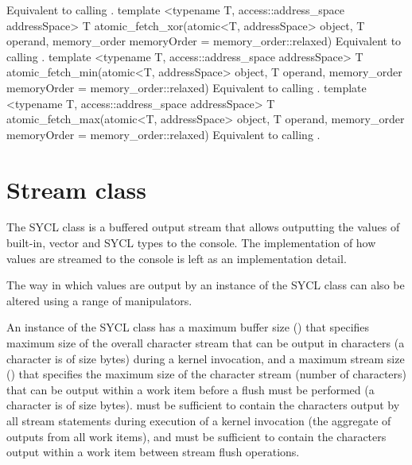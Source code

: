     {
      Equivalent to calling .
    }
  \addRowThreeSL
    { template <typename T, access::address_space addressSpace> }
    { T atomic_fetch_xor(atomic<T, addressSpace> object, T operand, }
    { memory_order memoryOrder = memory_order::relaxed) }
    {
      Equivalent to calling .
    }
  \addRowThreeSL
    { template <typename T, access::address_space addressSpace> }
    { T atomic_fetch_min(atomic<T, addressSpace> object, T operand, }
    { memory_order memoryOrder = memory_order::relaxed) }
    {
      Equivalent to calling .
    }
  \addRowThreeSL
    { template <typename T, access::address_space addressSpace> }
    { T atomic_fetch_max(atomic<T, addressSpace> object, T operand, }
    { memory_order memoryOrder = memory_order::relaxed) }
    {
      Equivalent to calling .
    }
\completeTable

\section{Stream class}
\label{subsection:stream}

The SYCL  class is a buffered output stream that allows outputting the values of built-in, vector and SYCL types to the console. The implementation of how values are streamed to the console is left as an implementation detail.

The way in which values are output by an instance of the SYCL  class can also be altered using a range of manipulators.

An instance of the SYCL  class has a maximum buffer size () that specifies maximum size of the overall character stream that can be output in characters (a character is of size  bytes) during a kernel invocation, and a maximum stream size () that specifies the maximum size of the character stream (number of characters) that can be output within a work item before a flush must be performed (a character is of size  bytes).   must be sufficient to contain the characters output by all stream statements during execution of a kernel invocation (the aggregate of outputs from all work items), and  must be sufficient to contain the characters output within a work item between stream flush operations.

